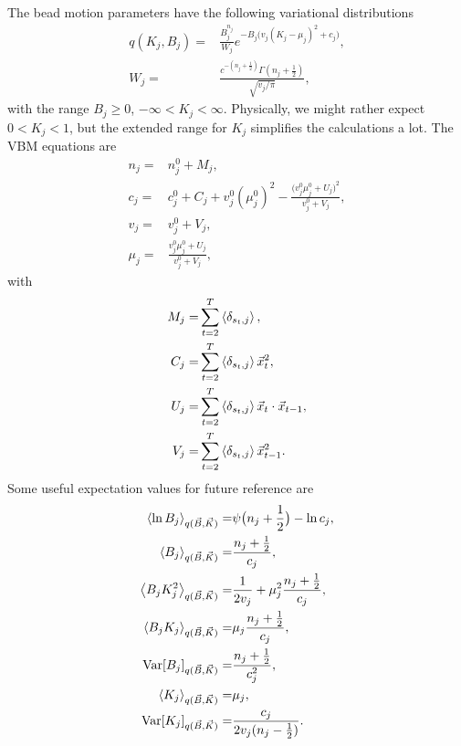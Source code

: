 The bead motion parameters have the following variational distributions
\begin{align}\label{seq:KBtrial}
  q(K_j,B_j)=&\frac{B_j^{n_j}}{W_j}e^{-B_j\big(v_j(K_j-\mu_j)^2+c_j\big)},\\
  W_j=&\frac{c^{-(n_j+\frac 12)}\Gamma(n_j+\frac 12)}{\sqrt{v_j/\pi}},
\end{align}
with the range $B_j\ge 0$, $-\infty<K_j<\infty$. Physically, we might
rather expect $0<K_j<1$, but the extended range for $K_j$ simplifies
the calculations a lot. The VBM equations are
\begin{align}
  n_j=& n_j^0+M_j,\\
  c_j=& c_j^0+C_j+v_j^0(\mu_j^0)^2
  -\frac{\big(v_j^0\mu_j^0+U_j\big)^2}{v_j^0+V_j},\\
  v_j=&v_j^0+V_j,\\
  \mu_j=&\frac{v_j^0\mu_j^0+U_j}{v_j^0+V_j},
\end{align}
with
\begin{align}
  M_j=&\sum_{t=2}^T\left\langle \delta_{s_t,j}\right\rangle,\\
  C_j=&\sum_{t=2}^T\left\langle \delta_{s_t,j}\right\rangle\vec{x}_t^2,\\
  U_j=&\sum_{t=2}^T\left\langle \delta_{s_t,j}\right\rangle\vec{x}_t\cdot\vec{x}_{t-1},\\
  V_j=&\sum_{t=2}^T\left\langle \delta_{s_t,j}\right\rangle\vec{x}_{t-1}^2.
\end{align}
Some useful expectation values for future reference are
\begin{align}
  \left\langle \ln B_j\right\rangle_{q(\vec{B},\vec{K})}=&\psi\big(n_j+\frac 12\big)-\ln c_j,
  \label{seq:meanBlogB}\\
  \left\langle B_j\right\rangle_{q(\vec{B},\vec{K})}=&\frac{n_j+\frac 12}{c_j},\\
  \left\langle B_jK_j^2\right\rangle_{q(\vec{B},\vec{K})}=&\frac{1}{2v_j}
  +\mu_j^2\frac{n_j+\frac 12}{c_j},\\
  \left\langle B_jK_j\right\rangle_{q(\vec{B},\vec{K})}=&\mu_j\frac{n_j+\frac 12}{c_j},
  \label{seq:meanbK2BK}\\
  \text{Var}[B_j]_{q(\vec{B},\vec{K})}=&\frac{n_j+\frac 12}{c_j^2},\\
  \left\langle K_j\right\rangle_{q(\vec{B},\vec{K})}=&\mu_j,\\ 
  \text{Var}[K_j]_{q(\vec{B},\vec{K})}=&\frac{c_j}{2v_j(n_j-\frac 12)}.
\end{align}
